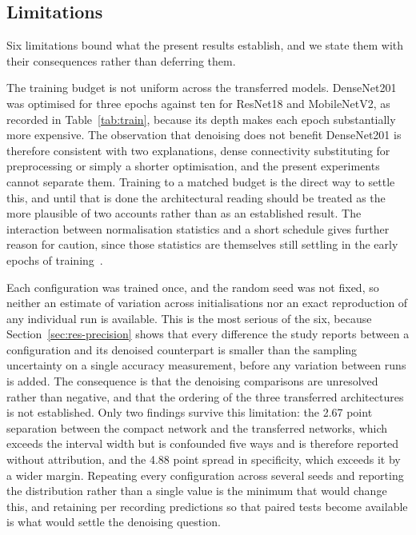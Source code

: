 \subsection{Limitations}\label{sec:res-limits}

Six limitations bound what the present results establish, and we state them
with their consequences rather than deferring them.

The training budget is not uniform across the transferred models. DenseNet201
was optimised for three epochs against ten for ResNet18 and MobileNetV2, as
recorded in Table~\ref{tab:train}, because its depth makes each epoch
substantially more expensive. The observation that denoising does not benefit
DenseNet201 is therefore consistent with two explanations, dense connectivity
substituting for preprocessing or simply a shorter optimisation, and the
present experiments cannot separate them. Training to a matched budget is the
direct way to settle this, and until that is done the architectural reading
should be treated as the more plausible of two accounts rather than as an
established result. The interaction between normalisation statistics and a
short schedule gives further reason for caution, since those statistics are
themselves still settling in the early epochs of
training~\cite{awais2021}.

Each configuration was trained once, and the random seed was not fixed, so
neither an estimate of variation across initialisations nor an exact
reproduction of any individual run is available. This is the most serious of
the six, because Section~\ref{sec:res-precision} shows that every difference
the study reports between a configuration and its denoised counterpart is
smaller than the sampling uncertainty on a single accuracy measurement, before
any variation between runs is added. The consequence is that the denoising
comparisons are unresolved rather than negative, and that the ordering of the
three transferred architectures is not established. Only two findings survive
this limitation: the 2.67 point separation between the compact network and the
transferred networks, which exceeds the interval width but is confounded five
ways and is therefore reported without attribution, and the 4.88 point spread
in specificity, which exceeds it by a wider margin. Repeating every
configuration across several seeds and reporting the distribution rather than
a single value is the minimum that would change this, and retaining per
recording predictions so that paired tests become available is what would
settle the denoising question.

